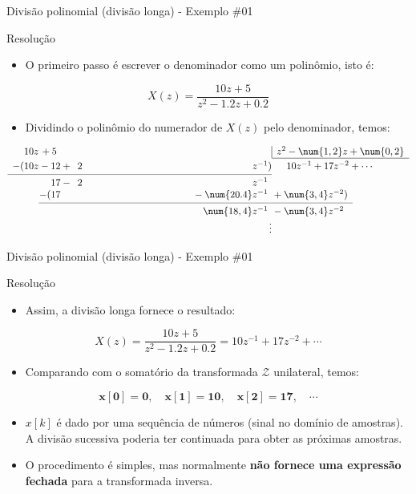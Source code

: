 \begin{frame}{Divisão polinomial (divisão longa) - Exemplo \#01}
\begin{block}{Resolução}
\begin{itemize}
    \item O primeiro passo é escrever o denominador como um polinômio, isto é:
\end{itemize}
	\[X(z)=\dfrac{10z+5}{z^2-\num{1.2}z+\num{0.2}}\]
	
\begin{itemize}
    \item Dividindo o polinômio do numerador de $X(z)$ pelo denominador, temos:
\end{itemize}

	\[ \begin{array}{r@{} r@{} r@{} r r}
		10z &{} + 5\Ph &{} &		 \multicolumn{2}{|l}{ z^{2}-\num{1,2}z+\num{0,2}} \\\cline{4-5}
		-(10z &{}-12 &{}+\hphantom{2}2\hphantom{\num[add-integer-zero=false]{.4}}z^{-1})	& \multicolumn{2}{l}{\quad10z^{-1}+17z^{-2}+\cdots}\rule{0pt}{2.6ex}\\
		\cmidrule{1-3}
		&{}17 &{}-\hphantom{2}2\hphantom{\num[add-integer-zero=false]{.4}}z^{-1}\Ph \\
		&-(17&{}-\num{20.4}z^{-1}\Ph	&{}+\num{3,4}z^{-2}) \\
		\cmidrule{2-4}
		& 			&\num{18,4}z^{-1}\Ph	&{}-\num{3,4}z^{-2}\Ph \\ & & \vdots
		\end{array} \]
\end{block}
\end{frame}

\begin{frame}{Divisão polinomial (divisão longa) - Exemplo \#01}
\begin{block}{Resolução}
\begin{itemize}
    \item Assim, a divisão longa fornece o resultado:
\end{itemize}
\[X(z)=\dfrac{10z+5}{z^2-\num{1.2}z+\num{0.2}} = 10z^{-1}+17z^{-2}+\cdots\]
\begin{itemize}
    \item Comparando com o somatório da transformada $\mathcal{Z}$ unilateral, temos: 
\end{itemize}

$$\bm{x[0] = 0, \quad x[1] = 10, \quad x[2] = 17, \quad \cdots}$$
\begin{itemize}
    \item $x[k]$ é dado por uma sequência de números (sinal no domínio de amostras). A divisão sucessiva poderia ter continuada para obter as próximas amostras.
    \item O procedimento é simples, mas normalmente \textbf{não fornece uma expressão fechada} para a transformada inversa.
\end{itemize}
\end{block}
\end{frame}

